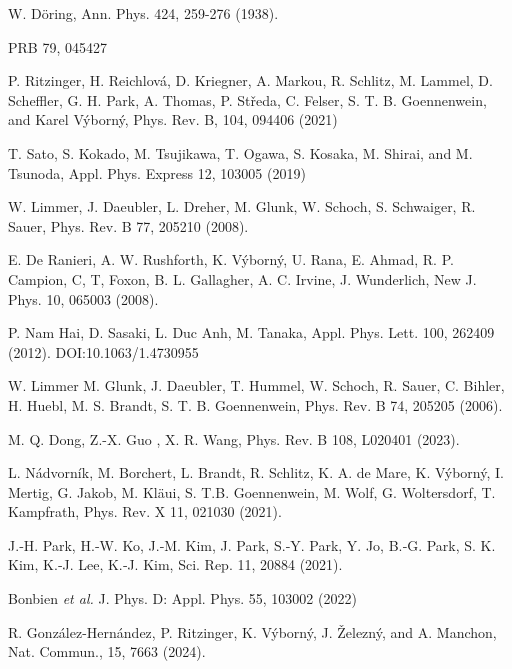 \documentclass[prb,showpacs,amsmath,amssymb,superscriptaddress,twocolumn,floatfix]{revtex4-1}
\begin{document}
\begin{thebibliography}{99}
 W. D\"oring, Ann. Phys. 424, 259-276
(1938). %

 PRB 79, 045427 
  
 P. Ritzinger, H. Reichlov\'a, D. Kriegner, A. Markou, R. Schlitz, M. Lammel, D. Scheffler, G. H. Park, A. Thomas, P. St\v{r}eda, C. Felser, S. T. B. Goennenwein, and Karel V\'yborn\'y, Phys. Rev. B, 104, 094406 (2021)

 T. Sato, S. Kokado, M. Tsujikawa, T. Ogawa, S. Kosaka, M. Shirai, and M. Tsunoda, Appl. Phys. Express 12, 103005 (2019)

 W. Limmer, J. Daeubler, L. Dreher, M. Glunk, W. Schoch, S. Schwaiger, R. Sauer, Phys. Rev. B 77, 205210 (2008). %

 E. De Ranieri, A. W. Rushforth, K. V\'yborn\'y, U. Rana, E. Ahmad, R. P. Campion, C, T, Foxon, B. L. Gallagher, A. C. Irvine, J. Wunderlich, New J. Phys. 10, 065003 (2008).%

 P. Nam Hai, D. Sasaki, L. Duc Anh, M. Tanaka, Appl. Phys. Lett. 100, 262409 (2012). DOI:10.1063/1.4730955

 W. Limmer M. Glunk, J. Daeubler, T. Hummel, W. Schoch, R. Sauer, C. Bihler, H. Huebl, M. S. Brandt, S. T. B. Goennenwein, Phys. Rev. B 74, 205205 (2006).%

 M. Q. Dong, Z.-X. Guo , X. R. Wang, Phys. Rev. B 108, L020401 (2023). %

 L. N\'{a}dvorn\'{i}k, M. Borchert, L. Brandt, R. Schlitz, K. A. de Mare, K. V\'{y}born\'{y}, I. Mertig, G. Jakob, M. {Kl\"{a}ui}, S. T.B. Goennenwein, M. Wolf, G. Woltersdorf, T. Kampfrath, Phys. Rev. X 11, 021030 (2021). %

 J.‑H. Park, H.‑W. Ko, J.‑M. Kim, J. Park, S.‑Y. Park, Y. Jo, B.‑G. Park, S. K. Kim, K.‑J. Lee, K.‑J. Kim, Sci. Rep. 11, 20884 (2021).%



 Bonbien \textit{et al.} J. Phys. D: Appl. Phys. 55, 103002 (2022)

 R. Gonz\'alez-Hern\'andez, P. Ritzinger, K. V\'yborn\'y, J. \v{Z}elezn\'y, and A. Manchon, Nat. Commun., 15, 7663 (2024).%


\end{thebibliography}
\end{document}
